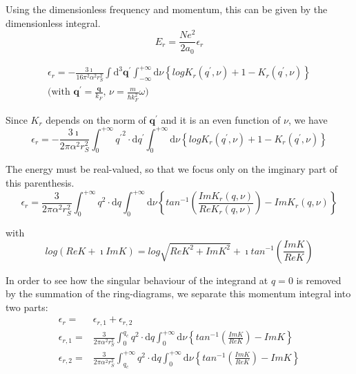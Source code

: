 Using the dimensionless frequency and momentum, this can be given by the dimensionless integral.
\begin{equation} \label{Eqs2.8.36}
E_r = \frac{N e^2}{2 a_0} \epsilon_r
\end{equation}

\[\begin{split} \epsilon_r = -\frac{3\imath}{16\pi^2 \alpha^2 r_S^2} \int \mathrm{d}^3 \mathbf{q}^{'}\int_{-\infty}^{+\infty} \mathrm{d}\nu \left\{ logK_r(q^{'},\nu) + 1-K_r(q^{'},\nu) \right\}\\\text{(with $\mathbf{q}^{'} = \frac{\mathbf{q}}{k_F}$, $\nu = \frac{m}{\hbar k_F^2} \omega$)}\end{split} \]

Since $K_r$ depends on the norm of $\mathbf{q}^{'}$ and it is an even function of $\nu$, we have
\[ \epsilon_r = -\frac{3\imath}{2\pi \alpha^2 r_S^2} \int_0^{+\infty} {q^{'}}^2 \cdot \mathrm{d}q^{'} \int_{0}^{+\infty} \mathrm{d}\nu \left\{ log K_r(q^{'},\nu) + 1-K_r(q^{'},\nu) \right\}\]

The energy must be real-valued, so that we focus only on the imginary part of this parenthesis.
\begin{equation} \label{Eqs2.8.37}
\epsilon_r = \frac{3}{2\pi \alpha^2 r_S^2} \int_0^{+\infty} q^2 \cdot \mathrm{d}q \int_0^{+\infty} \mathrm{d}\nu \left\{ tan^{-1}\left( \frac{Im K_r(q,\nu)}{Re K_r(q,\nu)} \right) - Im K_r(q,\nu) \right\}
\end{equation}

with
\begin{equation} \label{Eqs2.8.38}
log(Re K + \imath Im K) = log \sqrt{Re K^2 + Im K^2} + \imath tan^{-1} \left( \frac{Im K}{Re K} \right)
\end{equation}

In order to see how the singular behaviour of the integrand at $q=0$ is removed by the summation of the ring-diagrams, we separate this momentum integral into two parts:
\begin{eqnarray}
\epsilon_r =& \epsilon_{r,1} + \epsilon_{r,2} \nonumber\\
\epsilon_{r,1} =& \frac{3}{2\pi \alpha^2 r_S^2} \int_0^{q_c} q^2 \cdot \mathrm{d} q \int_0^{+\infty} \mathrm{d} \nu \left\{ tan^{-1}\left( \frac{Im K}{Re K} \right) - Im K  \right\} \label{Eqs2.8.39}\\
\epsilon_{r,2} =& \frac{3}{2\pi \alpha^2 r_S^2} \int_{q_c}^{+\infty} q^2 \cdot \mathrm{d} q \int_0^{+\infty} \mathrm{d} \nu \left\{ tan^{-1}\left( \frac{Im K}{Re K} \right) - Im K  \right\} \label{Eqs2.8.40}
\end{eqnarray}


